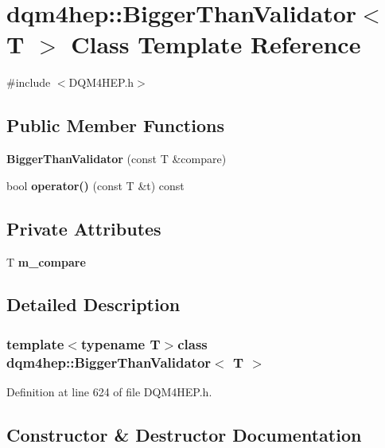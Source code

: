 \section{dqm4hep\+:\+:Bigger\+Than\+Validator$<$ T $>$ Class Template Reference}
\label{classdqm4hep_1_1BiggerThanValidator}


{\ttfamily \#include $<$D\+Q\+M4\+H\+E\+P.\+h$>$}

\subsection*{Public Member Functions}
\begin{DoxyCompactItemize}
\item 
{\bf Bigger\+Than\+Validator} (const T \&compare)
\item 
bool {\bf operator()} (const T \&t) const 
\end{DoxyCompactItemize}
\subsection*{Private Attributes}
\begin{DoxyCompactItemize}
\item 
T {\bf m\+\_\+compare}
\end{DoxyCompactItemize}


\subsection{Detailed Description}
\subsubsection*{template$<$typename T$>$class dqm4hep\+::\+Bigger\+Than\+Validator$<$ T $>$}



Definition at line 624 of file D\+Q\+M4\+H\+E\+P.\+h.



\subsection{Constructor \& Destructor Documentation}
